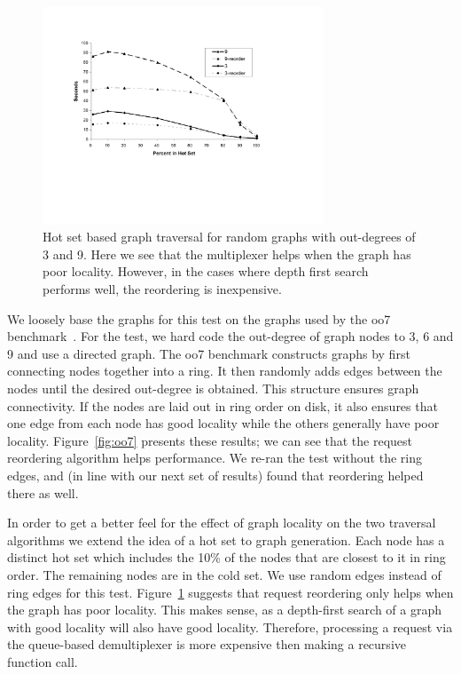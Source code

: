 \documentclass[10pt,letterpaper,twocolumn,english]{article}
\begin{document}
\begin{figure}[t]
\includegraphics[width=3.3in]{../paper2/trans-closure-hotset.pdf}
\vspace{-12pt}
\caption{\sf\label{fig:hotGraph} Hot set based graph traversal for random graphs with out-degrees of 3 and 9.  Here
we see that the multiplexer helps when the graph has poor locality.
However, in the cases where depth first search performs well, the
reordering is inexpensive.}
\end{figure}

We loosely base the graphs for this test on the graphs used by the oo7
benchmark~\cite{oo7}.  For the test, we hard code the out-degree of
graph nodes to 3, 6 and 9 and use a directed graph.  The oo7 benchmark
constructs graphs by first connecting nodes together into a ring.  It
then randomly adds edges between the nodes until the desired out-degree
is obtained.  This structure ensures graph connectivity.  If the nodes
are laid out in ring order on disk, it also ensures that one edge
from each node has good locality while the others generally have poor
locality.  
Figure~\ref{fig:oo7} presents these results;  we can see that the request reordering algorithm
helps performance.  We re-ran the test without the ring edges, and (in
line with our next set of results) found that reordering
helped there as well.

In order to get a better feel for the effect of graph locality on the
two traversal algorithms we extend the idea of a hot set to graph
generation.  Each node has a distinct hot set which includes the 10\%
of the nodes that are closest to it in ring order.  The remaining
nodes are in the cold set.  We use random edges instead of ring edges
for this test.  Figure~\ref{fig:hotGraph} suggests that request reordering 
only helps when the graph has poor locality.  This makes sense, as a 
depth-first search of a graph with good locality will also have good 
locality.  Therefore, processing a request via the queue-based demultiplexer 
is more expensive then making a recursive function call.
\end{document}
